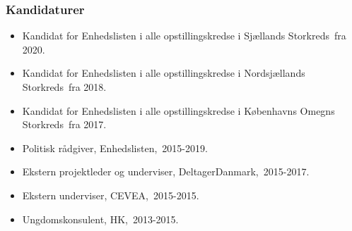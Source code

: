 \documentclass[11pt, a4paper]{awesome-cv}
\begin{document}
\begin{cvletter}
\subsubsection*{Kandidaturer}
\begin{itemize}
\item Kandidat for Enhedslisten i alle opstillingskredse i Sjællands Storkreds fra 2020.
\item Kandidat for Enhedslisten i alle opstillingskredse i Nordsjællands Storkreds fra 2018.
\item Kandidat for Enhedslisten i alle opstillingskredse i Københavns Omegns Storkreds fra 2017.
\end{itemize}
\begin{itemize}
\item Politisk rådgiver, Enhedslisten, 2015-2019.
\item Ekstern projektleder og underviser, DeltagerDanmark, 2015-2017.
\item Ekstern underviser, CEVEA, 2015-2015.
\item Ungdomskonsulent, HK, 2013-2015.
\end{itemize}
\end{cvletter}
\end{document}
